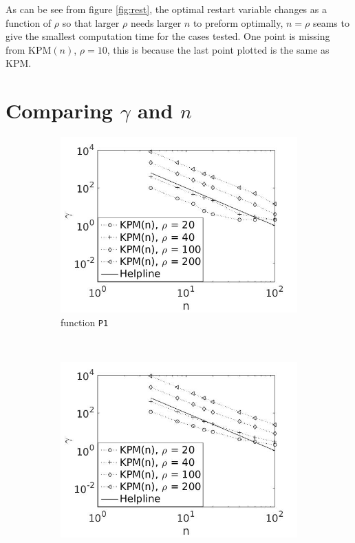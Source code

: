As can be see from figure \ref{fig:rest}, the optimal restart variable changes as a function of $\rho$ so that larger $\rho$ needs larger $n$ to preform optimally, $n = \rho$ seams to give the smallest computation time for the cases tested. One point is missing from KPM$(n)$, $\rho = 10$, this is because the last point plotted is the same as KPM.  
\section{Comparing $\gamma$ and $n$} \label{sec:rrest}
\begin{figure}[H]
        \centering
        \begin{subfigure}[b]{0.45\textwidth}
                \includegraphics[width=\textwidth]{fig/s3antvsm1}
                \caption{function \texttt{P1}}
                \label{fig:ant1}
        \end{subfigure}%
~
        \begin{subfigure}[b]{0.45\textwidth}
                \includegraphics[width=\textwidth]{fig/s4antvsm2}

\end{subfigure}
\end{figure}
